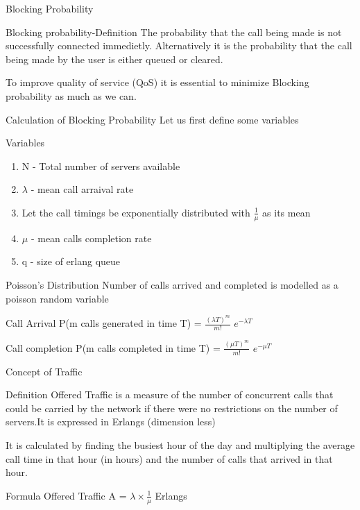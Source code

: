 \documentclass{beamer}
\begin{document}
\begin{frame}{Blocking Probability}
  \begin{block}{Blocking probability-Definition}
    The probability that the call being made is not successfully connected immedietly. Alternatively it is
    the probability that the call being made by the user is either queued or cleared.
  \end{block}
  To improve quality of service (QoS) it is essential to minimize Blocking probability as much as we can.
\end{frame}
\begin{frame}{Calculation of Blocking Probability}
  Let us first define some variables
  \begin{block}{Variables}
    \begin{enumerate}
      \item N - Total number of servers available
      \item $\lambda$ - mean call arraival rate
      \item Let the call timings be exponentially distributed with $\frac{1}{\mu}$ as its mean
      \item $\mu$ - mean calls completion rate
      \item q - size of erlang queue
    \end{enumerate}
  \end{block}
\end{frame}
\begin{frame}{Poisson's Distribution}
  Number of calls arrived and completed is modelled as a poisson random variable
  \begin{block}{Call Arrival}
    P(m calls generated in time T) = $\frac{{(\lambda T)^m}}{m!}$ $e^{-\lambda T}$
  \end{block}
  \begin{block}{Call completion}
    P(m calls completed in time T) = $\frac{{(\mu T)^m}}{m!}$ $e^{-\mu T}$
  \end{block}
\end{frame}
\begin{frame}{Concept of Traffic}
  \begin{block}{Definition}
    Offered Traffic is a measure of the number of concurrent calls that could be carried by the network if
    there were no restrictions on the number of servers.It is expressed in Erlangs (dimension less)
  \end{block}
  It is calculated by finding the busiest hour of the day and multiplying the average call time in that hour (in hours)
  and the number of calls that arrived in that hour.
  \begin{block}{Formula}
    Offered Traffic A = $\lambda \times \frac{1}{\mu}$ Erlangs
  \end{block}
\end{frame}
\end{document}
